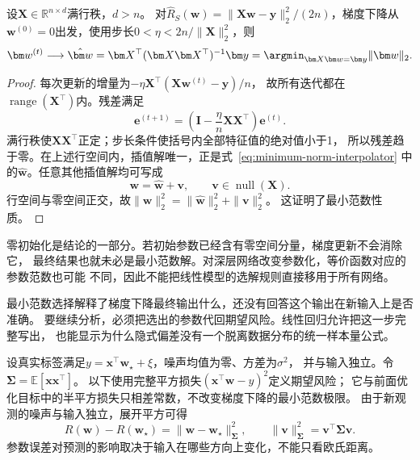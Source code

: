 \begin{theorem}[梯度下降的最小范数选择]
\label{thm:gradient-descent-minimum-norm}
设$\bm X\in\mathbb R^{n\times d}$满行秩，$d>n$。
对$\hat R_S(\bm w)=\|\bm X\bm w-\bm y\|_2^2/(2n)$，梯度下降从
$\bm w^{(0)}=0$出发，使用步长$0<\eta<2n/\|\bm X\|_2^2$，则
\begin{equation}
 \bm w^{(t)}\longrightarrow\hat{\bm w}
 =\bm X^\top(\bm X\bm X^\top)^{-1}\bm y
 =\argmin_{\bm X\bm w=\bm y}\|\bm w\|_2.
 \label{eq:minimum-norm-interpolator}
\end{equation}
\end{theorem}
\begin{proof}
每次更新的增量为$-\eta\bm X^\top(\bm X\bm w^{(t)}-\bm y)/n$，
故所有迭代都在$\operatorname{range}(\bm X^\top)$内。残差满足
\[
 \bm e^{(t+1)}=
 \left(\bm I-\frac\eta n\bm X\bm X^\top\right)\bm e^{(t)}.
\]
满行秩使$\bm X\bm X^\top$正定；步长条件使括号内全部特征值的绝对值小于1，
所以残差趋于零。在上述行空间内，插值解唯一，正是式~\eqref{eq:minimum-norm-interpolator}
中的$\hat{\bm w}$。任意其他插值解均可写成
\begin{equation}
 \bm w=\hat{\bm w}+\bm v,\qquad\bm v\in\operatorname{null}(\bm X).
 \label{eq:interpolator-decomposition}
\end{equation}
行空间与零空间正交，故$\|\bm w\|_2^2=\|\hat{\bm w}\|_2^2+\|\bm v\|_2^2$。
这证明了最小范数性质。
\end{proof}

零初始化是结论的一部分。若初始参数已经含有零空间分量，梯度更新不会消除它，
最终结果也就未必是最小范数解。对深层网络改变参数化，等价函数对应的参数范数也可能
不同，因此不能把线性模型的选解规则直接移用于所有网络。

最小范数选择解释了梯度下降最终输出什么，还没有回答这个输出在新输入上是否准确。
要继续分析，必须把选出的参数代回期望风险。线性回归允许把这一步完整写出，
也能显示为什么隐式偏差没有一个脱离数据分布的统一样本量公式。

设真实标签满足$y=\bm x^\top\bm w_\star+\xi$，噪声均值为零、方差为$\sigma^2$，
并与输入独立。令$\bm\Sigma=\mathbb E[\bm x\bm x^\top]$。
以下使用完整平方损失$(\bm x^\top\bm w-y)^2$定义期望风险；
它与前面优化目标中的半平方损失只相差常数，不改变梯度下降的最小范数极限。
由于新观测的噪声与输入独立，展开平方可得
\[
 R(\bm w)-R(\bm w_\star)
 =\|\bm w-\bm w_\star\|_{\bm\Sigma}^2,
 \qquad\|\bm v\|_{\bm\Sigma}^2=\bm v^\top\bm\Sigma\bm v.
\]
参数误差对预测的影响取决于输入在哪些方向上变化，不能只看欧氏距离。

